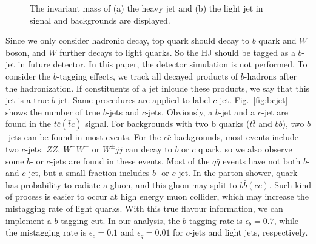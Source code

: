 \documentclass[a4paper,11pt]{article}
\begin{document}
\begin{figure}[htbp]
  \setcounter{subfigure}{0}
  \centering
  \caption{The invariant mass of (a) the heavy jet and (b) the light jet in signal and backgrounds are displayed.}\label{fig:mj1mj2}
\end{figure}

Since we only consider hadronic decay, top quark should decay to $b$ quark and $W$ boson, 
and $W$ further decays to light quarks. 
So the HJ should be tagged as a $b$-jet in future detector. 
In this paper, the detector simulation is not performed. 
To consider the $b$-tagging effects, we track all decayed products of $b$-hadrons after the hadronization. 
If constituents of a jet inlcude these products, we say that this jet is a true $b$-jet. 
Same procedures are applied to label $c$-jet. 
Fig.~\ref{fig:bcjet} shows the number of true $b$-jets and $c$-jets.
Obviously, a $b$-jet and a $c$-jet are found in the $t\bar{c}(\bar{t}c)$ signal. 
For backgrounds with two b quarks ($t\bar{t}$ and $b\bar{b}$), two $b$-jets can be found in most events.
For the $c\bar{c}$ backgrounds, most events include two $c$-jets.
$ZZ$, $W^+W^-$ or $W^{\pm}jj$ can decay to $b$ or $c$ quark, 
so we also observe some $b$- or $c$-jets are found in these events.
Most of the $q\bar{q}$ events have not both $b$- and $c$-jet, 
but a small fraction includes $b$- or $c$-jet. 
In the parton shower, quark has probability to radiate a gluon, 
and this gluon may split to $b\bar{b}(c\bar{c})$. 
Such kind of process is easier to occur at high energy muon collider, 
which may increase the mistagging rate of light quarks. 
With this true flavour information, we can implement a $b$-tagging cut. 
In our analysis, the $b$-tagging rate is $\epsilon_{b}=0.7$, 
while the mistagging rate is $\epsilon_{c}=0.1$ and $\epsilon_{q}=0.01$ for $c$-jets and light jets, respectively.
\end{document}
